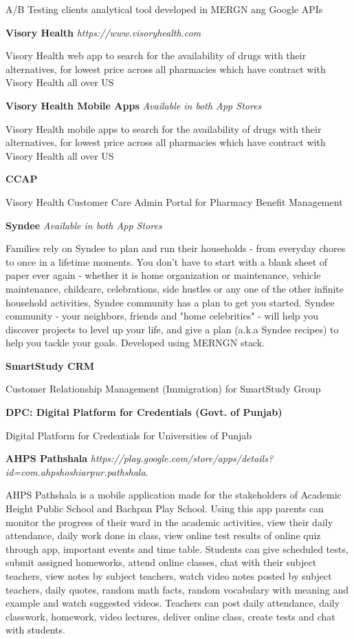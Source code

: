 \documentclass[margin,line]{res}
\begin{document}
\begin{resume}
A/B Testing clients analytical tool developed in MERGN ang Google APIs

\textbf{Visory Health} {\em https://www.visoryhealth.com}

Visory Health web app to search for the availability of drugs with their alternatives, for lowest price across all pharmacies which have contract with Visory Health all over US

\textbf{Visory Health Mobile Apps} {\em Available in both App Stores}

Visory Health mobile apps to search for the availability of drugs with their alternatives, for lowest price across all pharmacies which have contract with Visory Health all over US

\textbf{CCAP}

Visory Health Customer Care Admin Portal for Pharmacy Benefit Management

\textbf{Syndee} {\em Available in both App Stores}

Families rely on Syndee to plan and run their households - from everyday chores to once in a lifetime moments. You don't have to start with a blank sheet of paper ever again - whether it is home organization or maintenance, vehicle maintenance, childcare, celebrations, side hustles or any one of the other infinite household activities, Syndee community has a plan to get you started. Syndee community - your neighbors, friends and "home celebrities" - will help you discover projects to level up your life, and give a plan (a.k.a Syndee recipes) to help you tackle your goals. Developed using MERNGN stack.

\textbf{SmartStudy CRM}

Customer Relationship Management (Immigration) for SmartStudy Group

\textbf{DPC: Digital Platform for Credentials (Govt. of Punjab)}

Digital Platform for Credentials for Universities of Punjab

\textbf{AHPS Pathshala} {\em https://play.google.com/store/apps/details?id=com.ahpshoshiarpur.pathshala}. 

AHPS Pathshala is a mobile application made for the stakeholders of Academic Height Public School and Bachpan Play School. Using this app parents can monitor the progress of their ward in the academic activities, view their daily attendance, daily work done in class, view online test results of online quiz through app, important events and time table. Students can give scheduled tests, submit assigned homeworks, attend online classes, chat with their subject teachers, view notes by subject teachers, watch video notes posted by subject teachers, daily quotes, random math facts, random vocabulary with meaning and example and watch suggested videos. Teachers can post daily attendance, daily classwork, homework, video lectures, deliver online class, create tests and chat with students. 


\end{resume}
\end{document}
